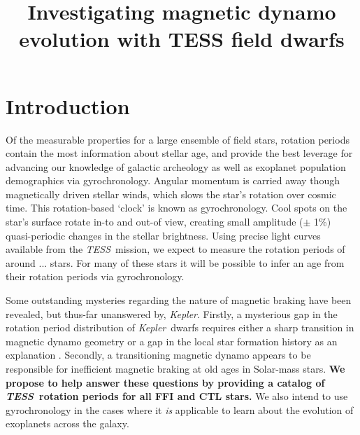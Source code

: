 \documentclass[useAMS, usenatbib, preprint, 12pt]{aastex}
\newcommand{\Kepler}{{\it Kepler}}
\newcommand{\kepler}{\Kepler}
\newcommand{\TESS}{{\it TESS}}
\newcommand{\columbia}{1}
\newcommand{\ww}{2}
\newcommand{\cca}{3}
\newcommand{\florida}{4}
\newcommand{\princeton}{5}
\newcommand{\nsf}{4}
\newcommand{\simons}{2}
\newcommand{\hubble}{7}
\begin{document}
\title{Investigating magnetic dynamo evolution with TESS field dwarfs}



\section{Introduction}

Of the measurable properties for a large ensemble of field stars, rotation
periods contain the most information about stellar age, and provide the best
leverage for advancing our knowledge of galactic archeology as well as
exoplanet population demographics via gyrochronology.
Angular momentum is carried away though magnetically driven stellar winds,
which slows the star’s rotation over cosmic time.
This rotation-based `clock' is known as gyrochronology.
Cool spots on the star’s surface rotate in-to and out-of view, creating small
amplitude ($\pm$ 1\%) quasi-periodic changes in the stellar brightness.
Using precise light curves available from the \TESS\ mission, we expect to
measure the rotation periods of around ... stars.
For many of these stars it will be possible to infer an age from their
rotation periods via gyrochronology.

Some outstanding mysteries regarding the nature of magnetic braking have been
revealed, but thus-far unanswered by, \kepler.
Firstly, a mysterious gap in the rotation period distribution of \Kepler\
dwarfs requires either a sharp transition in magnetic dynamo geometry or a gap
in the local star formation history as an explanation \citep{mcquillan2014,
davenport2017}.
Secondly, a transitioning magnetic dynamo appears to be responsible for
inefficient magnetic braking at old ages in Solar-mass stars.
{\bf We propose to help answer these questions by providing a catalog of \TESS\
rotation periods for all FFI and CTL stars.}
We also intend to use gyrochronology in the cases where it {\it is} applicable
to learn about the evolution of exoplanets across the galaxy.
\end{document}
